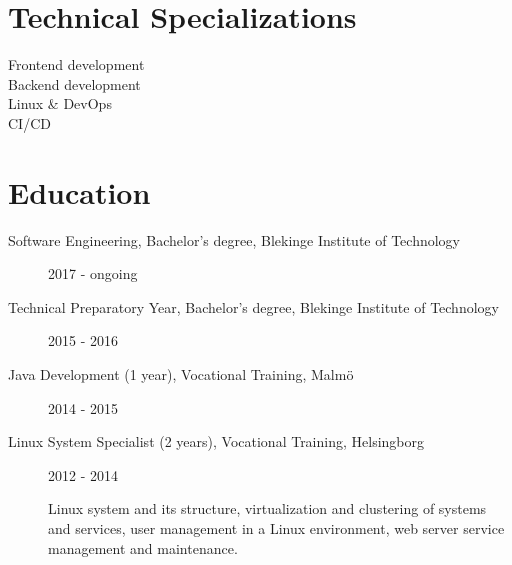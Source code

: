 \documentclass{article}
\begin{document}
\begin{minipage}[t]{0.4\textwidth}
	
	\section*{\textcolor{colorBlue}{Technical Specializations}}
	
	\begin{description}
		\item [ Frontend development ]
		\item [ Backend development ]
		\vspace{-5pt}\item [ Linux \& DevOps ] 
		\vspace{-5pt}\item [ CI/CD ]
		\vspace{-5pt}
	\end{description}
	
\end{minipage}%
\hfill
\begin{minipage}[t]{0.6\textwidth}
	
	\section*{\textcolor{colorBlue}{Education}}
	
	\begin{description}
		\item [ Software Engineering, Bachelor's degree, Blekinge Institute of Technology ] 2017 - ongoing
		\item [ Technical Preparatory Year, Bachelor's degree, Blekinge Institute of Technology ] 2015 - 2016
		\item [ Java Development (1 year), Vocational Training, Malmö ] 2014 - 2015
		
		\item [ Linux System Specialist (2 years), Vocational Training, Helsingborg ] 2012 - 2014 
		
		Linux system and its structure, virtualization and clustering of systems and services, user management in a Linux environment, web server service management and maintenance.
	\end{description}
	
\end{minipage}%
\vspace{10pt}
\end{document}
